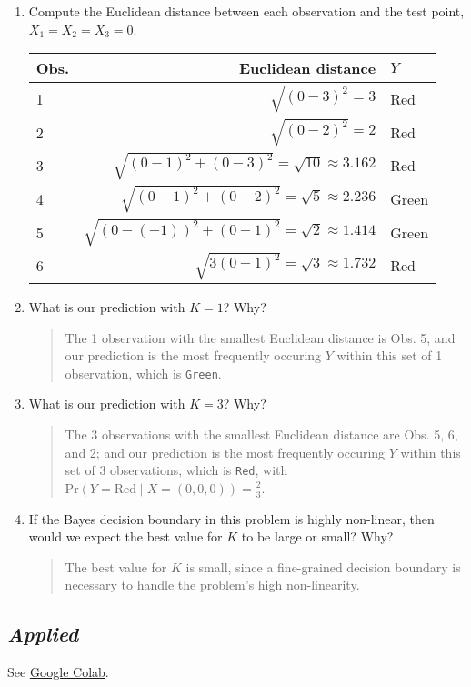 \documentclass[11pt]{article}
\newenvironment{answer}{
\begin{quote}}{
\end{quote}}
\begin{document}
\begin{enumerate}
    \begin{enumerate}
      \item Compute the Euclidean distance between each observation
        and the test point, $X_1 = X_2 = X_3 = 0$.
        \begin{center}
          \begin{tabular}{l|rl}
            \hline
            Obs. & Euclidean distance & $Y$ \\
            \hline
            1 & $\sqrt{(0-3)^2}=3$ & Red \\
            2 & $\sqrt{(0-2)^2}=2$ & Red \\
            3 & $\sqrt{(0-1)^2 + (0-3)^2} = \sqrt{10} \approx 3.162$ & Red \\
            4 & $\sqrt{(0-1)^2 + (0-2)^2} = \sqrt{5} \approx 2.236$ & Green \\
            5 & $\sqrt{(0-(-1))^2 + (0-1)^2} = \sqrt{2} \approx
            1.414$ & Green \\
            6 & $\sqrt{3(0-1)^2} =\sqrt{3} \approx 1.732$ & Red \\
            \hline
          \end{tabular}
        \end{center}
      \item What is our prediction with $K = 1$? Why?
        \begin{answer}
          The 1 observation with the smallest Euclidean distance is
          Obs. 5, and our prediction is the most frequently occuring
          $Y$ within this set of 1 observation, which is \texttt{Green}.
        \end{answer}
      \item What is our prediction with $K = 3$? Why?
        \begin{answer}
          The 3 observations with the smallest Euclidean distance are
          Obs. 5, 6, and 2; and our prediction is the most frequently
          occuring $Y$ within this set of 3 observations, which is
          \texttt{Red}, with $\text{Pr}(Y=\text{Red} \mid
          X=(0,0,0))=\frac{2}{3}$.
        \end{answer}
      \item If the Bayes decision boundary in this problem is highly
        non-linear, then would we expect the best value for $K$ to be
        large or small? Why?
        \begin{answer}
            The best value for $K$ is small, since a fine-grained decision boundary is necessary to handle the problem's high non-linearity.
        \end{answer}
    \end{enumerate}

\end{enumerate}

\subsection*{\textit{Applied}}

See \href{https://colab.research.google.com/drive/1gZ7HiWsGWmQqEyFaiqSYPD1kgsCf8bTk}{Google Colab}.
\end{document}

